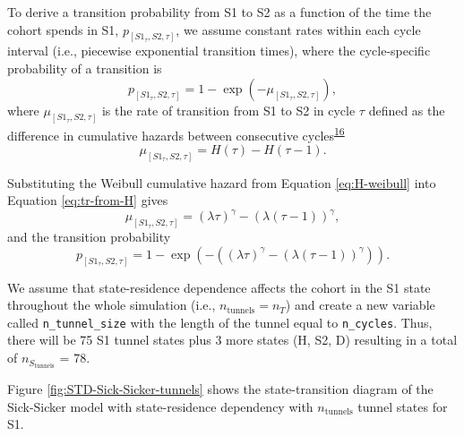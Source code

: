 \documentclass[
]{article}
\begin{document}
To derive a transition probability from S1 to S2 as a function of the time the cohort spends in S1, \(p_{\left[S1_{\tau},S2, \tau\right]}\), we assume constant rates within each cycle interval (i.e., piecewise exponential transition times), where the cycle-specific probability of a transition is
\begin{equation}
  p_{\left[S1_{\tau},S2, \tau\right]} = 1-\exp{\left(-\mu_{\left[S1_{\tau},S2, \tau\right]}\right)},
\label{eq:tp-from-rate}
\end{equation}
where \(\mu_{\left[S1_{\tau},S2, \tau\right]}\) is the rate of transition from S1 to S2 in cycle \(\tau\) defined as the difference in cumulative hazards between consecutive cycles\textsuperscript{\protect\hyperlink{ref-Diaby2014}{16}}
\begin{equation}
  \mu_{\left[S1_{\tau},S2, \tau\right]} = H(\tau) - H(\tau-1).
\label{eq:tr-from-H}
\end{equation}

Substituting the Weibull cumulative hazard from Equation \eqref{eq:H-weibull} into Equation \eqref{eq:tr-from-H} gives
\begin{equation}
  \mu_{\left[S1_{\tau},S2, \tau\right]} = (\lambda \tau)^{\gamma} - (\lambda (\tau-1))^{\gamma},
\label{eq:tr-from-H-weibull}
\end{equation}
and the transition probability
\begin{equation}
  p_{\left[S1_{\tau},S2, \tau\right]} = 1-\exp{\left(- \left((\lambda \tau)^{\gamma} - (\lambda (\tau-1))^{\gamma}\right) \right)}.
\label{eq:tp-from-H-weibull}
\end{equation}

We assume that state-residence dependence affects the cohort in the S1 state throughout the whole simulation (i.e., \(n_{\text{tunnels}}=n_T\)) and create a new variable called \texttt{n\_tunnel\_size} with the length of the tunnel equal to \texttt{n\_cycles}. Thus, there will be 75 S1 tunnel states plus 3 more states (H, S2, D) resulting in a total of \(n_{S_{\text{tunnels}}}\) = 78.

Figure \ref{fig:STD-Sick-Sicker-tunnels} shows the state-transition diagram of the Sick-Sicker model with state-residence dependency with \(n_{\text{tunnels}}\) tunnel states for S1.
\end{document}
